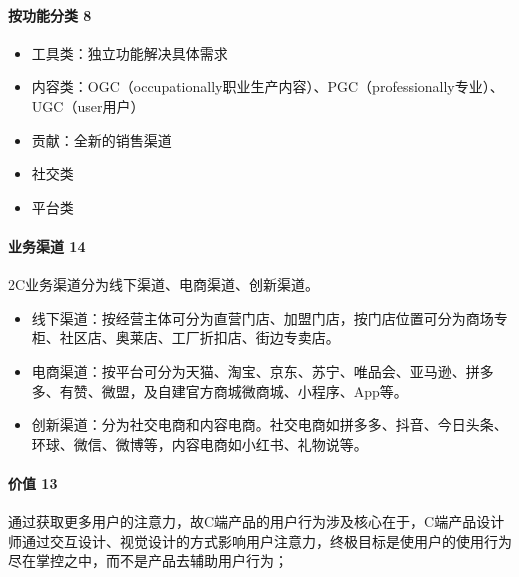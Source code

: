 \documentclass[letterpaper,11pt,english]{sphinxmanual}
\begin{document}
\paragraph{按功能分类 8\sphinxfootnotemark[72]}
\label{\detokenize{chapter_introduction/2C:id3}}%
\begin{footnotetext}[72]\sphinxAtStartFootnote
{}
%
\end{footnotetext}\ignorespaces \begin{itemize}
\item {} 
工具类：独立功能解决具体需求

\item {} 
内容类：OGC（occupationally职业生产内容）、PGC（professionally专业）、UGC（user用户）

\item {} 
贡献：全新的销售渠道

\item {} 
社交类

\item {} 
平台类

\end{itemize}


\paragraph{业务渠道 14\sphinxfootnotemark[73]}
\label{\detokenize{chapter_introduction/2C:id4}}%
\begin{footnotetext}[73]\sphinxAtStartFootnote
{}
%
\end{footnotetext}\ignorespaces 
2C业务渠道分为线下渠道、电商渠道、创新渠道。
\begin{itemize}
\item {} 
线下渠道：按经营主体可分为直营门店、加盟门店，按门店位置可分为商场专柜、社区店、奥莱店、工厂折扣店、街边专卖店。

\item {} 
电商渠道：按平台可分为天猫、淘宝、京东、苏宁、唯品会、亚马逊、拼多多、有赞、微盟，及自建官方商城微商城、小程序、App等。

\item {} 
创新渠道：分为社交电商和内容电商。社交电商如拼多多、抖音、今日头条、环球、微信、微博等，内容电商如小红书、礼物说等。

\end{itemize}


\paragraph{价值 13\sphinxfootnotemark[74]}
\label{\detokenize{chapter_introduction/2C:id5}}%
\begin{footnotetext}[74]\sphinxAtStartFootnote
{}
%
\end{footnotetext}\ignorespaces 
通过获取更多用户的注意力，故C端产品的用户行为涉及核心在于，C端产品设计师通过交互设计、视觉设计的方式影响用户注意力，终极目标是使用户的使用行为尽在掌控之中，而不是产品去辅助用户行为；
\end{document}
